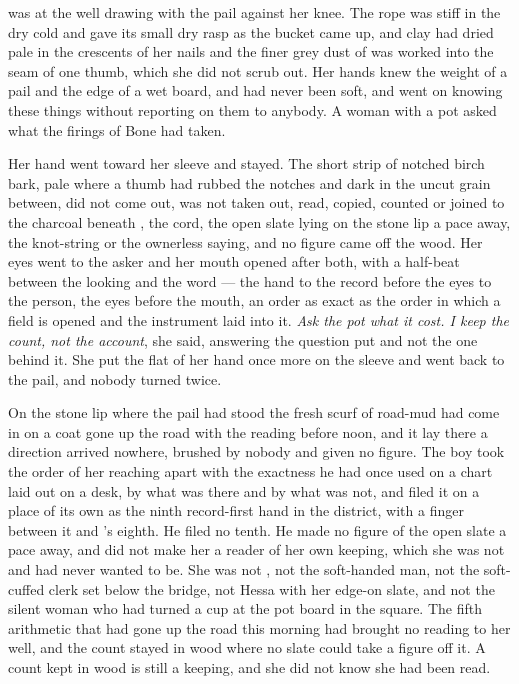  was at the well drawing with the pail against her knee. The rope was stiff in the dry cold and gave its small dry rasp as the bucket came up, and clay had dried pale in the crescents of her nails and the finer grey dust of  was worked into the seam of one thumb, which she did not scrub out. Her hands knew the weight of a pail and the edge of a wet board, and had never been soft, and went on knowing these things without reporting on them to anybody. A woman with a pot asked what the firings of Bone had taken.

Her hand went toward her sleeve and stayed. The short strip of notched birch bark, pale where a thumb had rubbed the notches and dark in the uncut grain between, did not come out, was not taken out, read, copied, counted or joined to the charcoal beneath , the cord, the open slate lying on the stone lip a pace away, the knot-string or the ownerless saying, and no figure came off the wood. Her eyes went to the asker and her mouth opened after both, with a half-beat between the looking and the word --- the hand to the record before the eyes to the person, the eyes before the mouth, an order as exact as the order in which a field is opened and the instrument laid into it. \emph{Ask the pot what it cost. I keep the count, not the account}, she said, answering the question put and not the one behind it. She put the flat of her hand once more on the sleeve and went back to the pail, and nobody turned twice.

On the stone lip where the pail had stood the fresh scurf of road-mud had come in on a coat gone up the road with the reading before noon, and it lay there a direction arrived nowhere, brushed by nobody and given no figure. The boy took the order of her reaching apart with the exactness he had once used on a chart laid out on a desk, by what was there and by what was not, and filed it on a place of its own as the ninth record-first hand in the district, with a finger between it and 's eighth. He filed no tenth. He made no figure of the open slate a pace away, and did not make her a reader of her own keeping, which she was not and had never wanted to be. She was not , not the soft-handed man, not the soft-cuffed clerk set below the bridge, not Hessa with her edge-on slate, and not the silent woman who had turned a cup at the pot board in the square. The fifth arithmetic that had gone up the road this morning had brought no reading to her well, and the count stayed in wood where no slate could take a figure off it. A count kept in wood is still a keeping, and she did not know she had been read.

